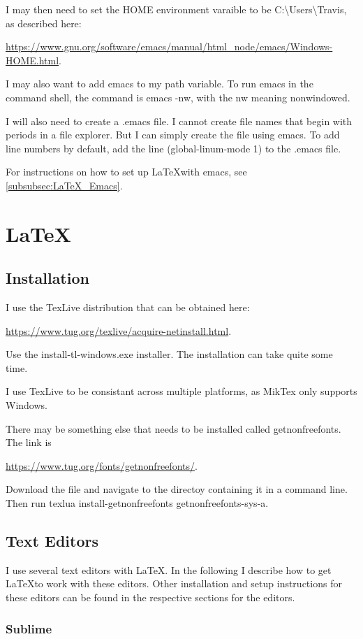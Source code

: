\documentclass{article}
\newcommand{\web}[2]{
	\begin{center}
		\url{#1}{#2}
	\end{center}
}
\begin{document}
I may then need to set the HOME environment varaible to be C:\textbackslash{}Users\textbackslash{}Travis,
	as described here:
	\web{https://www.gnu.org/software/emacs/manual/html_node/emacs/Windows-HOME.html}.
I may also want to add emacs to my path variable.
To run emacs in the command shell, the command is emacs -nw, with the nw meaning nonwindowed.

I will also need to create a .emacs file.
I cannot create file names that begin with periods in a file explorer.
But I can simply create the file using emacs.
To add line numbers by default, add the line (global-linum-mode 1) to the .emacs file.

For instructions on how to set up \LaTeX with emacs, see \cref{subsubsec:LaTeX_Emacs}.

\section{\LaTeX}

\subsection{Installation}

I use the TexLive distribution that can be obtained here:
	\web{https://www.tug.org/texlive/acquire-netinstall.html}.
Use the install-tl-windows.exe installer.
The installation can take quite some time.

I use TexLive to be consistant across multiple platforms, as MikTex only supports Windows.

There may be something else that needs to be installed called getnonfreefonts.
The link is \web{https://www.tug.org/fonts/getnonfreefonts/}.
Download the file and navigate to the directoy containing it in a command line.
Then run texlua install-getnonfreefonts getnonfreefonts-sys-a.

\subsection{Text Editors}

I use several text editors with \LaTeX.
In the following I describe how to get \LaTeX to work with these editors.
Other installation and setup instructions for these editors can be found in the respective sections for the editors.

\subsubsection{Sublime}
\end{document}
